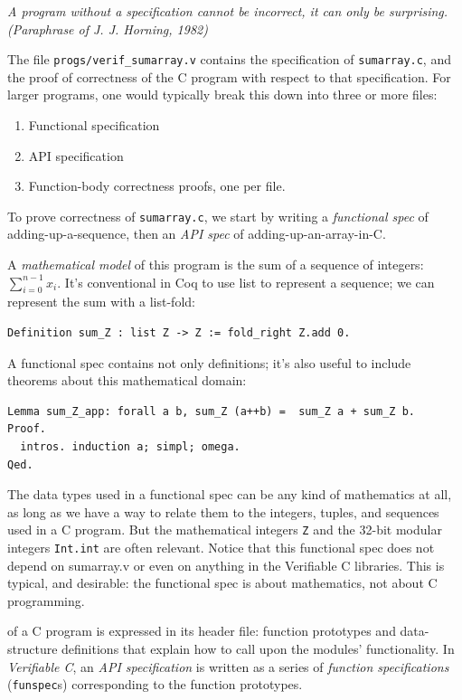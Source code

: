 \documentclass[12pt,fleqn,openany,oneside,showtrims]{memoir}
\begin{document}
\emph{A program without a specification cannot be \emph{incorrect},
it can only be \emph{surprising}.  \hfill (Paraphrase of J. J. Horning, 1982)}

The file \lstinline{progs/verif_sumarray.v} contains
the specification of \lstinline{sumarray.c},
and the proof of correctness of the C program with respect
to that specification.  For larger programs, one would
typically break this down into three or more files:
\begin{enumerate}
\item Functional specification
\item API specification
\item Function-body correctness proofs, one per file.
\end{enumerate}

To prove correctness of \lstinline{sumarray.c},
we start by writing a \emph{functional spec} of adding-up-a-sequence,
then an \emph{API spec} of adding-up-an-array-in-C.

A \emph{mathematical model} of this program is the sum of a sequence
of integers: $\sum_{i=0}^{n-1}x_i$.  It's conventional in Coq to use
\textsf{list} to represent a sequence; we can represent the sum
with a list-fold:
\begin{lstlisting}
Definition sum_Z : list Z -> Z := fold_right Z.add 0.
\end{lstlisting}
A functional spec contains not only definitions; it's also
useful to include theorems about this mathematical domain:
\begin{lstlisting}
Lemma sum_Z_app: forall a b, sum_Z (a++b) =  sum_Z a + sum_Z b.
Proof.
  intros. induction a; simpl; omega.
Qed.
\end{lstlisting}
The data types used in a functional spec can be any kind of mathematics
at all, as long as we have a way to relate them to the integers,
tuples, and sequences used in a C program.  But the mathematical integers
\lstinline{Z} and the 32-bit modular integers
\lstinline{Int.int} are often relevant.
Notice that this functional spec does not depend
on sumarray.v or even on anything in the Verifiable C libraries.
This is typical, and desirable:
the functional spec is about mathematics,
not about C programming.

 of a C program is
expressed in its header file: function prototypes and data-structure
definitions that explain how to call upon the modules' functionality.
In \emph{Verifiable C}, an \emph{API specification} is written as a
series of \emph{function specifications} (\lstinline{funspec}s)
corresponding to the function prototypes.
\end{document}
